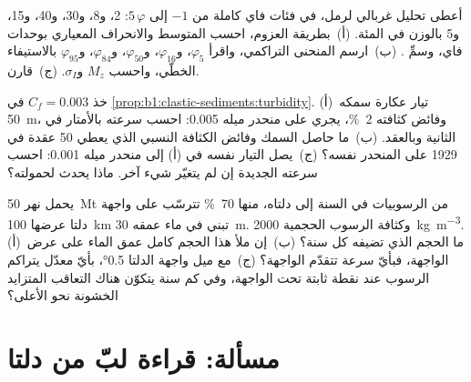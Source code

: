 \begin{exercise}[$\star\star\star$]\label{exo:b1:clastic-sediments:10}
أعطى تحليل غربالي لرمل، في فئات فاي كاملة من $-1$ إلى $5\,\varphi$: 2، و\num{8}، و\num{30}، و\num{40}، و\num{15}، و\num{5} بالوزن في المئة. (أ)~بطريقة العزوم، احسب المتوسط والانحراف المعياري بوحدات فاي، وسمِّ . (ب)~ارسم المنحنى التراكمي، واقرأ $\varphi_5$، و$\varphi_{16}$، و$\varphi_{50}$، و$\varphi_{84}$، و$\varphi_{95}$ بالاستيفاء الخطّي، واحسب $M_z$ و$\sigma_I$. (ج)~قارن.
\end{exercise}

\begin{exercise}[$\star\star\star$]\label{exo:b1:clastic-sediments:11}
خذ $C_f = 0.003$ في \cref{prop:b1:clastic-sediments:turbidity}. (أ)~تيار عكارة سمكه \qty{50}{m}، وفائض كثافته \qty{2}{\percent}، يجري على منحدر ميله \num{0.005}: احسب سرعته بالأمتار في الثانية وبالعقد. (ب)~ما حاصل السمك وفائض الكثافة النسبي الذي يعطي 50 عقدة في 1929 على المنحدر نفسه؟ (ج)~يصل التيار نفسه في (أ) إلى منحدر ميله \num{0.001}: احسب سرعته الجديدة إن لم يتغيّر شيء آخر. ماذا يحدث لحمولته؟
\end{exercise}

\begin{exercise}[$\star\star\star$]\label{exo:b1:clastic-sediments:12}
يحمل نهر \qty{50}{Mt} من الرسوبيات في السنة إلى دلتاه، منها \qty{70}{\percent} تترسّب على واجهة دلتا عرضها \qty{100}{km} تبني في ماء عمقه \qty{30}{m}. وكثافة الرسوب الحجمية \qty{2000}{kg.m^{-3}}. (أ)~ما الحجم الذي تضيفه كل سنة؟ (ب)~إن ملأ هذا الحجم كامل عمق الماء على عرض الواجهة، فبأيّ سرعة تتقدّم الواجهة؟ (ج)~مع ميل واجهة الدلتا \ang{0.5}، بأيّ معدّل يتراكم الرسوب عند نقطة ثابتة تحت الواجهة، وفي كم سنة يتكوّن هناك التعاقب المتزايد الخشونة نحو الأعلى؟
\end{exercise}

\section{مسألة: قراءة لبّ من دلتا}

